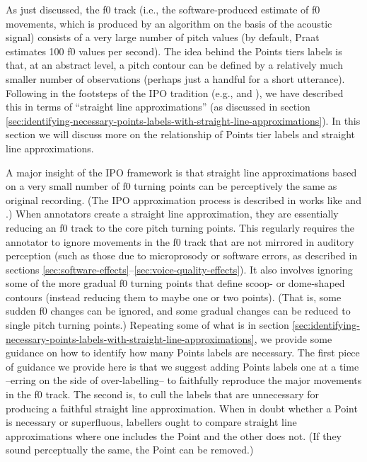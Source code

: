 \documentclass[11pt, twoside]{memoir}
\begin{document}
As just discussed, the f0 track (i.e., the software-produced estimate of f0 movements, which is produced by an algorithm on the basis of the acoustic signal) consists of a very large number of pitch values (by default, Praat estimates 100 f0 values per second). The idea behind the Points tiers labels is that, at an abstract level, a pitch contour can be defined by a relatively much smaller number of observations (perhaps just a handful for a short utterance). Following in the footsteps of the IPO tradition (e.g., \citealt{t-hartcollier75} and \citealt{t-hart-90}), we have described this in terms of “straight line approximations” (as discussed in section \ref{sec:identifying-necessary-points-labels-with-straight-line-approximations}). In this section we will discuss more on the relationship of Points tier labels and straight line approximations.

A major insight of the IPO framework is that straight line approximations based on a very small number of f0 turning points can be perceptively the same as original recording. (The IPO approximation process is described in works like \citealt{dutoit97} and \citealt{rao12}.) When annotators create a straight line approximation, they are essentially reducing an f0 track to the core pitch turning points. This regularly requires the annotator to ignore movements in the f0 track that are not mirrored in auditory perception (such as those due to microprosody or software errors, as described in sections \ref{sec:software-effects}–\ref{sec:voice-quality-effects}). It also involves ignoring some of the more gradual f0 turning points that define scoop- or dome-shaped contours (instead reducing them to maybe one or two points). (That is, some sudden f0 changes can be ignored, and some gradual changes can be reduced to single pitch turning points.) Repeating some of what is in section \ref{sec:identifying-necessary-points-labels-with-straight-line-approximations}, we provide some guidance on how to identify how many Points labels are necessary. The first piece of guidance we provide here is that we suggest adding Points labels one at a time –erring on the side of over-labelling– to faithfully reproduce the major movements in the f0 track. The second is, to cull the labels that are unnecessary for producing a faithful straight line approximation. When in doubt whether a Point is necessary or superfluous, labellers ought to compare straight line approximations where one includes the Point and the other does not. (If they sound perceptually the same, the Point can be removed.) 
\end{document}
